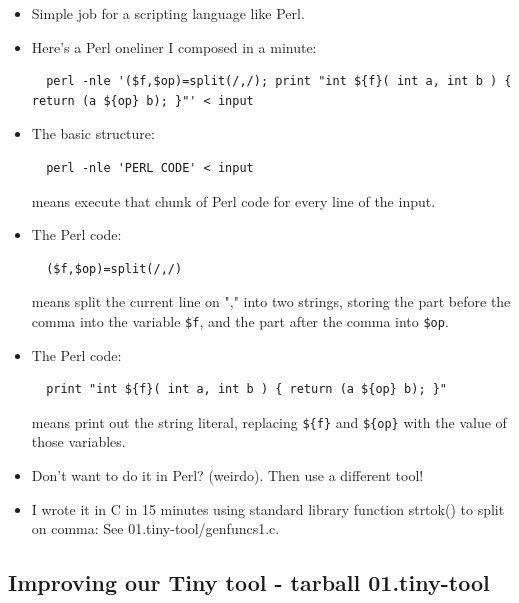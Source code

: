\documentclass[aspectratio=169]{beamer}
\newcommand{\pitem}{\pause \item}
\begin{document}
\begin{frame}[fragile]
    \begin{itemize}
    \item
      Simple job for a scripting language like \alert{Perl}.

    \pitem
      Here's a Perl oneliner I composed in a minute:

\tiny
\begin{verbatim}
  perl -nle '($f,$op)=split(/,/); print "int ${f}( int a, int b ) { return (a ${op} b); }"' < input
\end{verbatim}
\small

    \pitem
      The basic structure:
\tiny
\begin{verbatim}
  perl -nle 'PERL CODE' < input
\end{verbatim}
\small

     means execute that chunk of Perl code for every line of the input.

      \pitem
      The Perl code:
\tiny
\begin{verbatim}
  ($f,$op)=split(/,/)
\end{verbatim}
\small

     means split the current line on "," into two strings,
     storing the part before the comma into the variable \verb+$f+,
     and the part after the comma into \verb+$op+.

      \pitem
      The Perl code:
\tiny
\begin{verbatim}
  print "int ${f}( int a, int b ) { return (a ${op} b); }"
\end{verbatim}
\small
      means print out the string literal, replacing \verb+${f}+ and \verb+${op}+ with the value of those variables.



    \pitem
      Don't want to do it in Perl?   (weirdo).
      \pause
      Then use a different tool!

    \pitem
    I wrote it in C in 15 minutes using standard library function
    \alert{strtok()} to split on comma:
    See \alert{01.tiny-tool/genfuncs1.c}.

    \end{itemize}
\end{frame}

\subsection{Improving our Tiny tool - tarball 01.tiny-tool}
\end{document}
